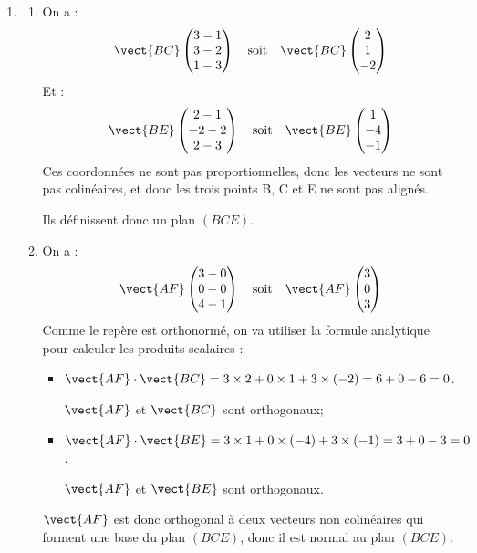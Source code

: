 \begin{enumerate}
\item \begin{enumerate}
\item On a :
\[
\vect{BC}\begin{pmatrix}3-1\\3-2\\1-3\end{pmatrix}\quad \text{soit}\quad \vect{BC}\begin{pmatrix}2\\1\\-2\end{pmatrix}
\]
Et :
\[
\vect{BE}\begin{pmatrix}2-1\\-2-2\\2-3\end{pmatrix}\quad \text{soit}\quad \vect{BE}\begin{pmatrix}1\\-4\\-1\end{pmatrix}
\]
Ces coordonnées ne sont pas proportionnelles, donc les vecteurs ne sont pas colinéaires, et donc les trois points B, C et E ne sont pas alignés.

Ils définissent donc un plan $(BCE)$.

\item On a :
\[
\vect{AF}\begin{pmatrix}3-0\\0-0\\4-1\end{pmatrix}\quad \text{soit}\quad \vect{AF}\begin{pmatrix}3\\0\\3\end{pmatrix}
\]
Comme le repère est orthonormé, on va utiliser la formule analytique pour calculer les produits scalaires :
\begin{itemize}
\item $\vect{AF}\cdot \vect{BC}=3\times 2+0\times 1+3\times(-2)=6+0-6=0$.

$\vect{AF}$ et $\vect{BC}$ sont orthogonaux;
\item $\vect{AF}\cdot \vect{BE}=3\times 1+0\times(-4)+3\times(-1)=3+0-3=0$.

$\vect{AF}$ et $\vect{BE}$ sont orthogonaux.
\end{itemize}
$\vect{AF}$ est donc orthogonal à deux vecteurs non colinéaires qui forment une base du plan $(BCE)$, donc il est normal au plan $(BCE)$.


\end{enumerate}
\end{enumerate}
